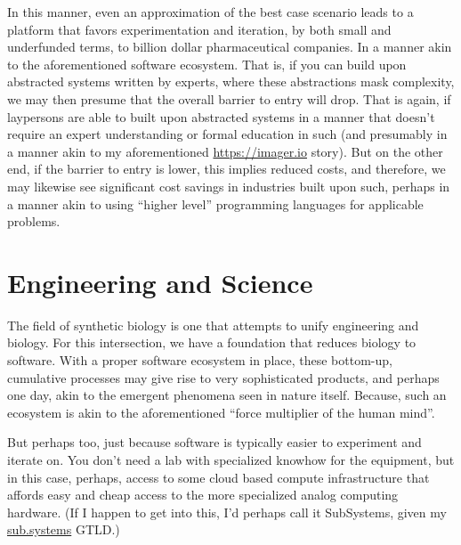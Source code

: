 In this manner, even an approximation of the best case scenario leads to a platform that favors experimentation and iteration, by both small and underfunded terms, to billion dollar pharmaceutical companies. In a manner akin to the aforementioned software ecosystem. That is, if you can build upon abstracted systems written by experts, where these abstractions mask complexity, we may then presume that the overall barrier to entry will drop. That is again, if laypersons are able to built upon abstracted systems in a manner that doesn't require an expert understanding or formal education in such (and presumably in a manner akin to my aforementioned \url{https://imager.io} story). But on the other end, if the barrier to entry is lower, this implies reduced costs, and therefore, we may likewise see significant cost savings in industries built upon such, perhaps in a manner akin to using ``higher level'' programming languages for applicable problems. 

\section*{Engineering and Science}

The field of synthetic biology is one that attempts to unify engineering and biology. For this intersection, we have a foundation that reduces biology to software. With a proper software ecosystem in place, these bottom-up, cumulative processes may give rise to very sophisticated products, and perhaps one day, akin to the emergent phenomena seen in nature itself. Because, such an ecosystem is akin to the aforementioned ``force multiplier of the human mind''.

But perhaps too, just because software is typically easier to experiment and iterate on. You don't need a lab with specialized knowhow for the equipment, but in this case, perhaps, access to some cloud based compute infrastructure that affords easy and cheap access to the more specialized analog computing hardware. (If I happen to get into this, I'd perhaps call it SubSystems, given my \url{sub.systems} GTLD.)
